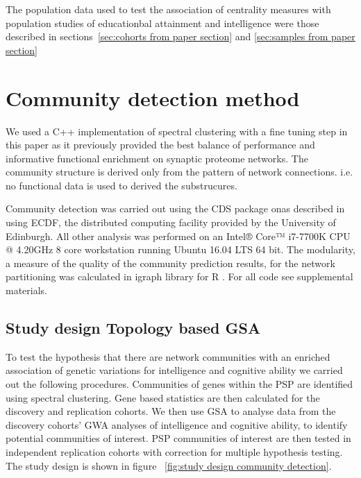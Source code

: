 The population data used to test the association of centrality measures with population studies of educationbal attainment and intelligence were those described in sections~\ref{sec:cohorts from paper section} and \ref{sec:samples from paper section}


\section{Community detection method}
\label{sec:community detection method paper section}

We used a C++ implementation of spectral clustering with a fine tuning step in this paper as it previously provided the best balance of performance and informative functional enrichment on synaptic proteome networks. \cite{mclean2016improved}  The community structure is derived only from the pattern of network connections. i.e. no functional data is used to derived the substrucures.

Community detection was carried out using the CDS package onas described in \cite{mclean2016improved} using ECDF, the distributed computing facility provided by the University of Edinburgh. All other analysis was performed on an Intel® Core™ i7-7700K CPU @ 4.20GHz 8 core workstation running Ubuntu 16.04 LTS 64 bit.  
The modularity, a measure of the quality of the community prediction results, for the network partitioning was calculated in igraph library for R \cite{csardi2006igraph} . For all code see supplemental materials. 


\subsection{Study design Topology based GSA}
To test the hypothesis that there are network communities with an enriched association of genetic variations for intelligence and cognitive ability we carried out the following procedures.
Communities of genes within the PSP are identified using spectral clustering. Gene based statistics are then calculated for the discovery and replication cohorts. We then use GSA to analyse data from the discovery cohorts’ GWA analyses of intelligence and cognitive ability, to identify potential communities of interest. PSP communities of interest are then tested in independent replication cohorts with correction for multiple hypothesis testing. The study design is shown in figure ~\ref{fig:study design community detection}.


